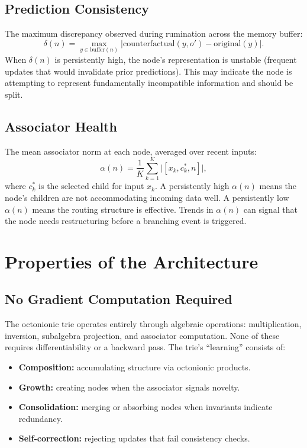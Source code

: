 \documentclass[11pt,a4paper]{article}
\theoremstyle{definition}
\theoremstyle{remark}
\begin{document}
\subsection{Prediction Consistency}

The maximum discrepancy observed during rumination across the memory buffer:
\begin{equation}
  \delta(n) = \max_{y \in \text{buffer}(n)} \lvert \text{counterfactual}(y, o') - \text{original}(y) \rvert.
\end{equation}
When $\delta(n)$ is persistently high, the node's representation is unstable (frequent updates that would invalidate prior predictions). This may indicate the node is attempting to represent fundamentally incompatible information and should be split.

\subsection{Associator Health}

The mean associator norm at each node, averaged over recent inputs:
\begin{equation}
  \alpha(n) = \frac{1}{K} \sum_{k=1}^{K} \lvert [x_k, c^*_k, n] \rvert,
\end{equation}
where $c^*_k$ is the selected child for input $x_k$. A persistently high $\alpha(n)$ means the node's children are not accommodating incoming data well. A persistently low $\alpha(n)$ means the routing structure is effective. Trends in $\alpha(n)$ can signal that the node needs restructuring before a branching event is triggered.

\section{Properties of the Architecture}
\label{sec:properties}

\subsection{No Gradient Computation Required}

The octonionic trie operates entirely through algebraic operations: multiplication, inversion, subalgebra projection, and associator computation. None of these requires differentiability or a backward pass. The trie's ``learning'' consists of:
\begin{itemize}[nosep]
  \item \textbf{Composition:} accumulating structure via octonionic products.
  \item \textbf{Growth:} creating nodes when the associator signals novelty.
  \item \textbf{Consolidation:} merging or absorbing nodes when invariants indicate redundancy.
  \item \textbf{Self-correction:} rejecting updates that fail consistency checks.
\end{itemize}
\end{document}
